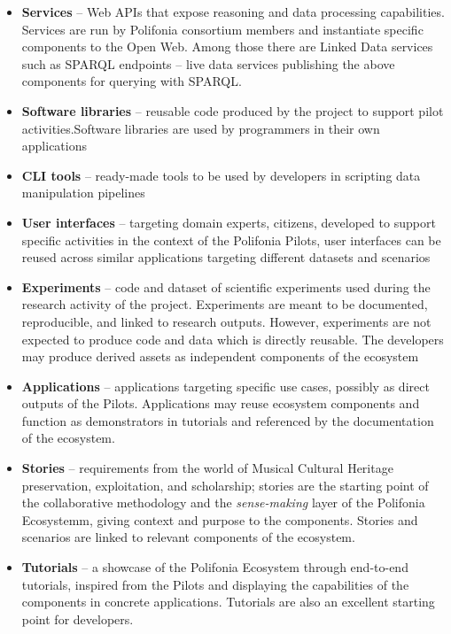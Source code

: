 \begin{itemize}
\item \textbf{Services} -- Web APIs that expose reasoning and data processing capabilities. Services are run by Polifonia consortium members and instantiate specific components to the Open Web. %
Among those there are Linked Data services such as SPARQL endpoints -- live data services publishing the above components for querying with SPARQL.
\item \textbf{Software libraries} -- reusable code produced by the project to support pilot activities.Software libraries are used by programmers in their own applications
\item \textbf{CLI tools} -- ready-made tools to be used by developers in scripting data manipulation pipelines
\item \textbf{User interfaces} -- targeting domain experts, citizens, developed to support specific activities in the context of the Polifonia Pilots, user interfaces can be reused across similar applications targeting different datasets and scenarios
\item \textbf{Experiments} -- code and dataset of scientific experiments used during the research activity of the project. Experiments are meant to be documented, reproducible, and linked to research outputs. However, experiments are not expected to produce code and data which is directly reusable. The developers may produce derived assets as independent components of the ecosystem
\item \textbf{Applications} -- applications targeting specific use cases, possibly as direct outputs of the Pilots. Applications may reuse ecosystem components and function as demonstrators in tutorials and referenced by the documentation of the ecosystem.
\item \textbf{Stories} -- requirements from the world of Musical Cultural Heritage preservation, exploitation, and scholarship; stories are the starting point of the collaborative methodology and the \textit{sense-making} layer of the Polifonia Ecosystemm, giving context and purpose to the components. Stories and scenarios are linked to relevant components of the ecosystem.
\item \textbf{Tutorials} -- a showcase of the Polifonia Ecosystem through end-to-end tutorials, inspired from the Pilots and displaying the capabilities of the components in concrete applications. Tutorials are also an excellent starting point for developers.

\end{itemize}
